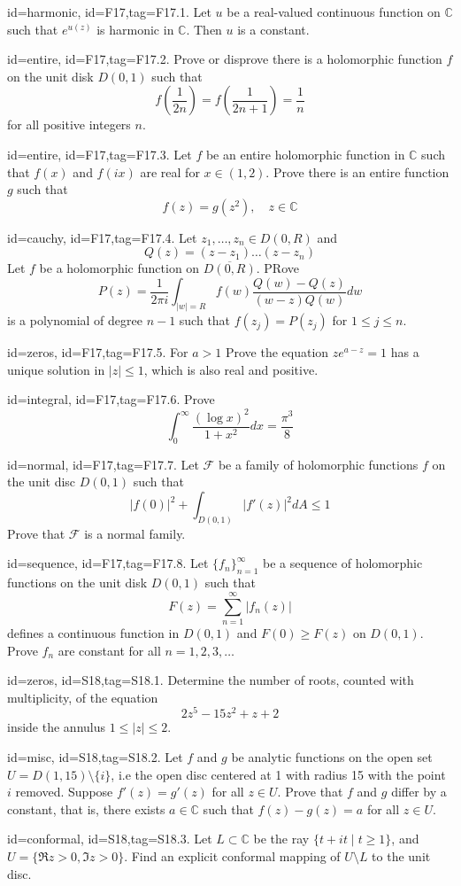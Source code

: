 \documentclass[12pt,letterpaper]{article}
\theoremstyle{plain}
\theoremstyle{definition}
\begin{document}
{%
\item[id=harmonic, id=F17,tag=F17.1.]
Let $u$ be a real-valued continuous function on $\mathbb{C}$ such that $e^{u(z)}$ is harmonic in $\mathbb{C}$. Then $u$ is a constant.
\item[id=entire, id=F17,tag=F17.2.]
Prove or disprove there is a holomorphic function $f$ on the unit disk $D(0,1)$ such that
\[
	f\left(\frac{1}{2n}\right) = f\left(\frac{1}{2n+1}\right) = \frac{1}{n}
\]
for all positive integers $n$.
\item[id=entire, id=F17,tag=F17.3.]
Let $f$ be an entire holomorphic function in $\mathbb{C}$ such that $f(x)$ and $f(ix)$ are real for $x \in (1,2)$. Prove there is an entire function $g$ such that
\[
	f(z) = g(z^2), \quad z \in \mathbb{C}
\]
\item[id=cauchy, id=F17,tag=F17.4.]
Let $z_1,\ldots,z_n \in D(0,R)$ and
\[
	Q(z) = (z - z_1)\ldots(z - z_n)
\]
Let $f$ be a holomorphic function on $\overline{D(0,R)}$. PRove
\[
	P(z) = \frac{1}{2\pi i} \int_{| w | = R} f(w) \frac{Q(w) - Q(z)}{(w - z)Q(w)} dw
\]
is a polynomial of degree $n - 1$ such that $f(z_j) = P(z_j)$ for $1 \le j \le n$.

\item[id=zeros, id=F17,tag=F17.5.]
For $a > 1$ Prove the equation $ze^{a-z} = 1$ has a unique solution in $| z | \le 1$, which is also real and positive.
\item[id=integral, id=F17,tag=F17.6.]
Prove
\[
	\int_{0}^{\infty} \frac{(\log x)^2}{1 + x^2} dx = \frac{\pi^3}{8}
\]
\item[id=normal, id=F17,tag=F17.7.]
Let $\mathcal{F}$ be a family of holomorphic functions $f$ on the unit disc $D(0,1)$ such that
\[
	| f(0) |^2 + \int_{D(0,1)} | f'(z) |^2 dA \le 1
\]
Prove that $\mathcal{F}$ is a normal family.

\item[id=sequence, id=F17,tag=F17.8.]
Let $\{f_n\}_{n=1}^{\infty}$ be a sequence of holomorphic functions on the unit disk $D(0,1)$ such that
\[
	F(z) = \sum_{n=1}^{\infty} | f_n(z) |
\]
defines a continuous function in $D(0,1)$ and $F(0) \ge F(z)$ on $D(0,1)$. Prove $f_n$ are constant for all $n = 1,2,3,\ldots$


\item[id=zeros, id=S18,tag=S18.1.]
Determine the number of roots, counted with multiplicity, of the equation
\[
	2z^5 - 15z^2 + z + 2
\]
inside the annulus $1 \le | z | \le 2$.
\item[id=misc, id=S18,tag=S18.2.]
Let $f$ and $g$ be analytic functions on the open set $U = D(1,15) \setminus \{i\}$, i.e the open disc centered at 1 with radius 15 with the point $i$ removed. Suppose $f'(z) = g'(z)$ for all $z \in U$. Prove that $f$ and $g$ differ by a constant, that is, there exists $a \in \mathbb{C}$ such that $f(z) - g(z) = a$ for all $z \in U$.
\item[id=conformal, id=S18,tag=S18.3.]
Let $L \subset \mathbb{C}$ be the ray $\{t + it \mid t \ge 1\}$, and $U = \{\Re z > 0, \Im z > 0\}$. Find an explicit conformal mapping of $U \setminus L$ to the unit disc.

}
\end{document}
